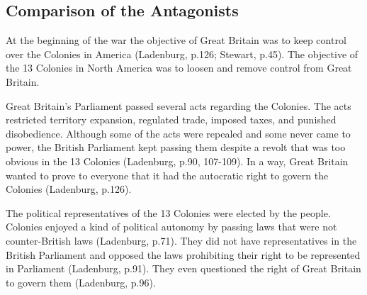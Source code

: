 \subsection{Comparison of the Antagonists}

At the beginning of the war the objective of Great Britain was to keep control
over the Colonies in America (Ladenburg, p.126; Stewart, p.45).  The objective
of the 13 Colonies in North America was to loosen and remove control from Great
Britain.

Great Britain’s Parliament passed several acts regarding the Colonies.  The acts
restricted territory expansion, regulated trade, imposed taxes, and punished
disobedience.  Although some of the acts were repealed and some never came to
power, the British Parliament kept passing them despite a revolt that was too
obvious in the 13 Colonies (Ladenburg, p.90, 107-109).  In a way, Great Britain
wanted to prove to everyone that it had the autocratic right to govern the
Colonies (Ladenburg, p.126).

The political representatives of the 13 Colonies were elected by the people.
Colonies enjoyed a kind of political autonomy by passing laws that were not
counter-British laws (Ladenburg, p.71).  They did not have representatives in
the British Parliament and opposed the laws prohibiting their right to be
represented in Parliament (Ladenburg, p.91).  They even questioned the right of
Great Britain to govern them (Ladenburg, p.96).

